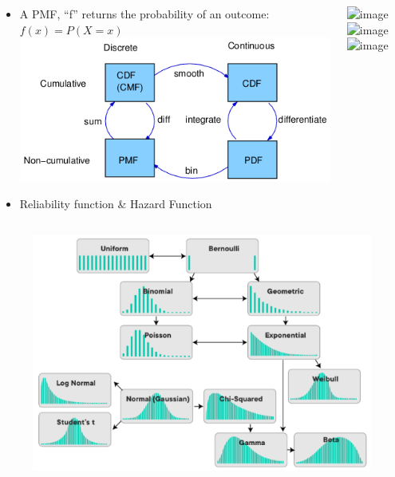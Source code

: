 \documentclass{beamer}
\begin{document}
\begin{frame}%
\begin{columns}
	\begin{column}{5cm}
		\begin{itemize}
			\item<1> A PMF, “f” returns the probability of an outcome: $f(x)=P(X=x)$ 
			 \includegraphics[scale=0.35]{CdfPdfPmf} 
			 \newline
			\item<2> Reliability function \& Hazard Function
		\end{itemize}
		\vspace{3cm} 
	\end{column}
	\begin{column}{5cm}
		\begin{overprint}		
			\includegraphics<1>[scale=0.3]{PmfCdfContinuous}
			\includegraphics<1>[scale=0.25]{pdfcdfDiscrete}
			\includegraphics<2>[scale=0.32]{cdfpdfrfhf}
		\end{overprint}
	\end{column}
\end{columns}
\end{frame}


\begin{frame}
	\begin{figure}
		\includegraphics[scale=.7]{Distributions}
	\end{figure}
\end{frame}
\end{document}

